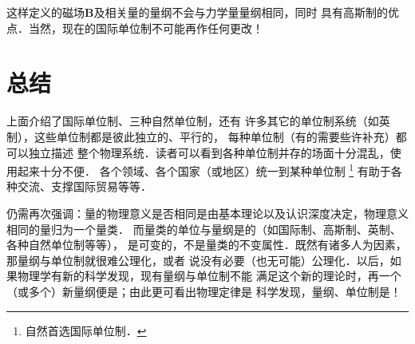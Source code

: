 这样定义的磁场$\boldsymbol{B}$及相关量的量纲不会与力学量量纲相同，同时
具有高斯制的优点．当然，现在的国际单位制不可能再作任何更改！



\section*{总结}
上面介绍了国际单位制、三种自然单位制，还有
许多其它的单位制系统（如英制），这些单位制都是彼此独立的、平行的，
每种单位制（有的需要些许补充）都可以独立描述
整个物理系统．读者可以看到各种单位制并存的场面十分混乱，使用起来十分不便．
各个领域、各个国家（或地区）统一到某种单位制
{\footnote{自然首选国际单位制．}}
有助于各种交流、支撑国际贸易等等．

仍需再次强调：量的物理意义是否相同是由基本理论以及认识深度决定，物理意义相同的量归为一个量类．
而量类的单位与量纲是的（如国际制、高斯制、英制、各种自然单位制等等），
是可变的，不是量类的不变属性．既然有诸多人为因素，那量纲与单位制就很难公理化，或者
说没有必要（也无可能）公理化．以后，如果物理学有新的科学发现，现有量纲与单位制不能
满足这个新的理论时，再一个（或多个）新量纲便是；由此更可看出物理定律是
科学发现，量纲、单位制是！




\printbibliography[heading=subbibliography,title=附录\ref{chunit-dim}参考文献]

\endinput






